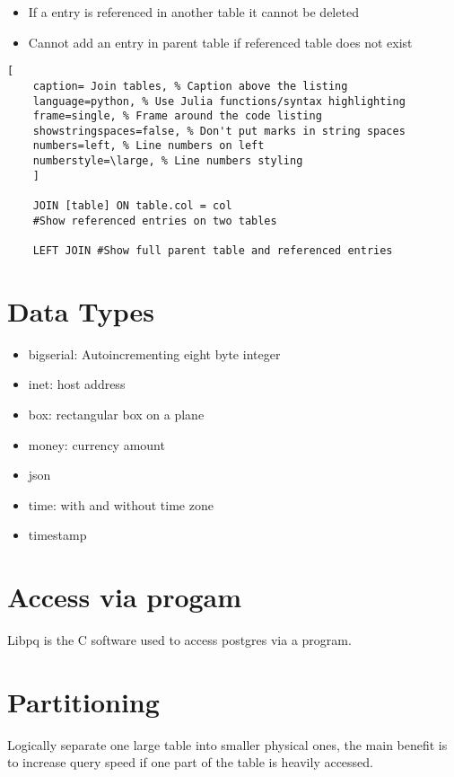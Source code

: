 \documentclass[11pt]{scrartcl} %
\begin{document}
\begin{itemize}
	\item If a entry is referenced in another table it cannot be deleted 
	\item Cannot add an entry in parent table if referenced table does not exist
\end{itemize}

\begin{lstlisting}[
	caption= Join tables, % Caption above the listing
	language=python, % Use Julia functions/syntax highlighting
	frame=single, % Frame around the code listing
	showstringspaces=false, % Don't put marks in string spaces
	numbers=left, % Line numbers on left
	numberstyle=\large, % Line numbers styling
	]

	JOIN [table] ON table.col = col
	#Show referenced entries on two tables

	LEFT JOIN #Show full parent table and referenced entries

\end{lstlisting}

\section{Data Types}

\begin{itemize}
	\item bigserial: Autoincrementing eight byte integer
	\item inet: host address
	\item box: rectangular box on a plane
	\item money: currency amount
	\item json
	\item time: with and without time zone
	\item timestamp
\end{itemize}

\section{Access via progam}

Libpq is the C software used to access postgres via a program.

\section{Partitioning}

Logically separate one large table into smaller physical ones, the main benefit is to
increase query speed if one part of the table is heavily accessed.\\
\end{document}
